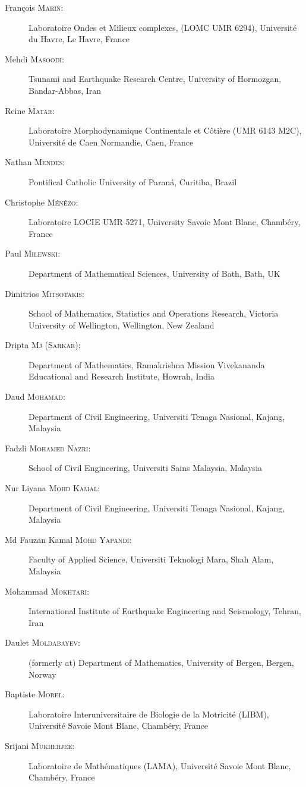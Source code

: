 \documentclass[final, a4paper, oneside, 12pt]{article}
\numberwithin{equation}{section}
\begin{document}
\begin{description}
  \item[Fran\c{c}ois \textsc{Marin}:] Laboratoire Ondes et Milieux complexes, (LOMC UMR 6294), Universit\'e du Havre, Le Havre, France
  \item[Mehdi \textsc{Masoodi}:] Tsunami and Earthquake Research Centre, University of Hormozgan, Bandar-Abbas, Iran
  \item[Reine \textsc{Matar}:] Laboratoire Morphodynamique Continentale et C\^oti\`ere (UMR 6143 M2C), Universit\'e de Caen Normandie, Caen, France
  \item[Nathan \textsc{Mendes}:] Pontifical Catholic University of Paran\'a, Curitiba, Brazil
  \item[Christophe \textsc{M\'en\'ezo}:] Laboratoire LOCIE UMR 5271, University Savoie Mont Blanc, Chamb\'ery, France
  \item[Paul \textsc{Milewski}:] Department of Mathematical Sciences, University of Bath, Bath, UK
  \item[Dimitrios \textsc{Mitsotakis}:] School of Mathematics, Statistics and Operations Research, Victoria University of Wellington, Wellington, New Zealand
  \item[Dripta \textsc{Mj} (\textsc{Sarkar}):] Department of Mathematics, Ramakrishna Mission Vivekananda Educational and Research Institute, Howrah, India
  \item[Daud \textsc{Mohamad}:] Department of Civil Engineering, Universiti Tenaga Nasional, Kajang, Malaysia
  \item[Fadzli \textsc{Mohamed Nazri}:] School of Civil Engineering, Universiti Sains Malaysia, Malaysia
  \item[Nur Liyana \textsc{Mohd Kamal}:] Department of Civil Engineering, Universiti Tenaga Nasional, Kajang, Malaysia
  \item[Md Fauzan Kamal \textsc{Mohd Yapandi}:] Faculty of Applied Science, Universiti Teknologi Mara, Shah Alam, Malaysia
  \item[Mohammad \textsc{Mokhtari}:] International Institute of Earthquake Engineering and Seismology, Tehran, Iran
  \item[Daulet \textsc{Moldabayev}:] (formerly at) Department of Mathematics, University of Bergen, Bergen, Norway
  \item[Baptiste \textsc{Morel}:] Laboratoire Interuniversitaire de Biologie de la Motricit\'e (LIBM), Universit\'e Savoie Mont Blanc, Chamb\'ery, France
  \item[Srijani \textsc{Mukherjee}:] Laboratoire de Math\'ematiques (LAMA), Universit\'e Savoie Mont Blanc, Chamb\'ery, France

\end{description}
\end{document}
